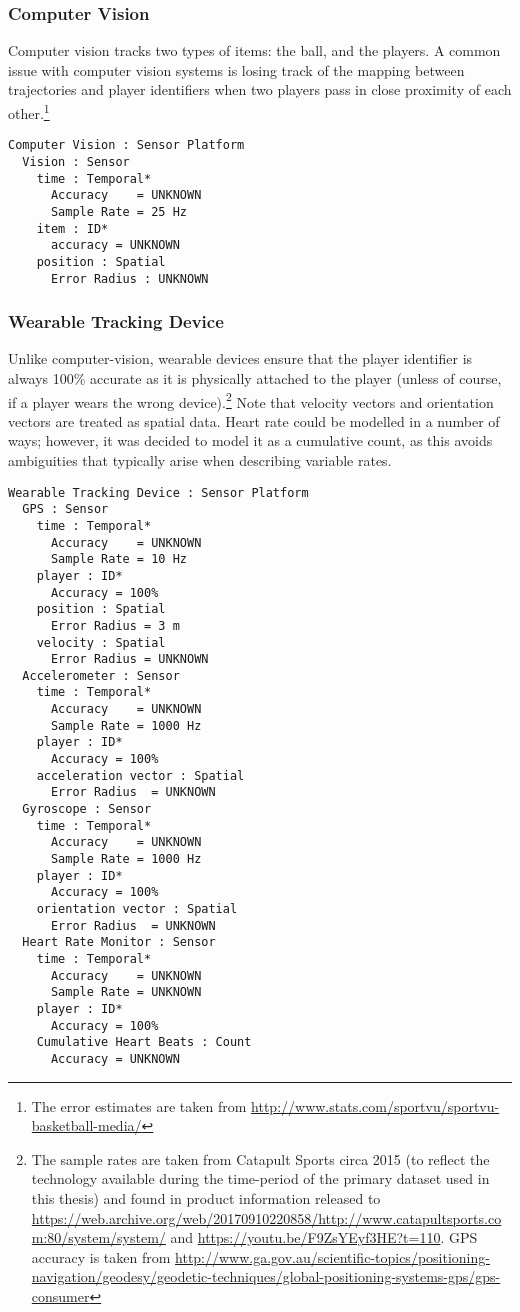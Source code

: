 \subsubsection{Computer Vision}\label{computer-vision}

Computer vision tracks two types of items: the ball, and the players. A
common issue with computer vision systems is losing track of the mapping
between trajectories and player identifiers when two players pass in close
proximity of each other.\footnote{The error estimates are taken from
  \url{http://www.stats.com/sportvu/sportvu-basketball-media/}}

\begin{verbatim}
Computer Vision : Sensor Platform
  Vision : Sensor
    time : Temporal*
      Accuracy    = UNKNOWN
      Sample Rate = 25 Hz
    item : ID*
      accuracy = UNKNOWN
    position : Spatial
      Error Radius : UNKNOWN
\end{verbatim}

\subsubsection{Wearable Tracking Device}\label{wearable-tracking-device}

Unlike computer-vision, wearable devices ensure that the player identifier is
always 100\% accurate as it is physically attached to the player (unless
of course, if a player wears the wrong device).\footnote{The sample
  rates are taken from Catapult Sports circa 2015 (to reflect the technology available during the time-period of the primary dataset used in this thesis) and found in product information released to \url{https://web.archive.org/web/20170910220858/http://www.catapultsports.com:80/system/system/} and
  \url{https://youtu.be/F9ZsYEyf3HE?t=110}. GPS accuracy is taken from
  \url{http://www.ga.gov.au/scientific-topics/positioning-navigation/geodesy/geodetic-techniques/global-positioning-systems-gps/gps-consumer}}
Note that velocity vectors and orientation vectors are treated as
spatial data. Heart rate could be modelled in a number of ways; however, it was
decided to model it as a cumulative count, as this avoids ambiguities
that typically arise when describing variable rates.

\begin{verbatim}
Wearable Tracking Device : Sensor Platform
  GPS : Sensor
    time : Temporal*
      Accuracy    = UNKNOWN
      Sample Rate = 10 Hz
    player : ID*
      Accuracy = 100%
    position : Spatial
      Error Radius = 3 m
    velocity : Spatial
      Error Radius = UNKNOWN
  Accelerometer : Sensor
    time : Temporal*
      Accuracy    = UNKNOWN
      Sample Rate = 1000 Hz
    player : ID*
      Accuracy = 100%
    acceleration vector : Spatial
      Error Radius  = UNKNOWN
  Gyroscope : Sensor
    time : Temporal*
      Accuracy    = UNKNOWN
      Sample Rate = 1000 Hz
    player : ID*
      Accuracy = 100%
    orientation vector : Spatial
      Error Radius  = UNKNOWN
  Heart Rate Monitor : Sensor
    time : Temporal*
      Accuracy    = UNKNOWN
      Sample Rate = UNKNOWN
    player : ID*
      Accuracy = 100%
    Cumulative Heart Beats : Count
      Accuracy = UNKNOWN
\end{verbatim}

